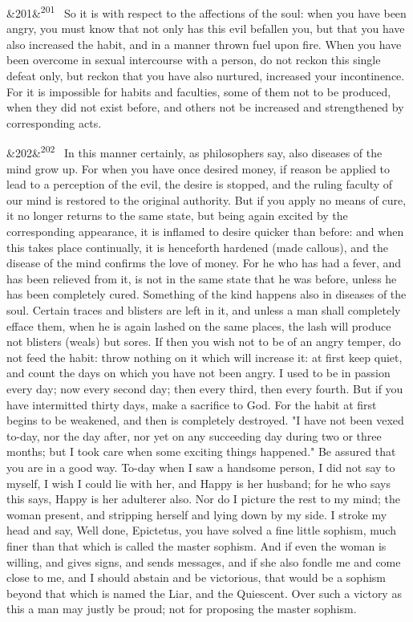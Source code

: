 \documentclass[12pt]{article}
\newcommand{\para}[1][]{\par\noindent\ifx&#1&\else\textsuperscript{\footnotesize #1}~\fi}
\begin{document}
\para[201] So it is with respect to the affections of the soul: when you have been angry, you must know that not only has this evil befallen you, but that you have also increased the habit, and in a manner thrown fuel upon fire. When you have been overcome in sexual intercourse with a person, do not reckon this single defeat only, but reckon that you have also nurtured, increased your incontinence. For it is impossible for habits and faculties, some of them not to be produced, when they did not exist before, and others not be increased and strengthened by corresponding acts.

\para[202] In this manner certainly, as philosophers say, also diseases of the mind grow up. For when you have once desired money, if reason be applied to lead to a perception of the evil, the desire is stopped, and the ruling faculty of our mind is restored to the original authority. But if you apply no means of cure, it no longer returns to the same state, but being again excited by the corresponding appearance, it is inflamed to desire quicker than before: and when this takes place continually, it is henceforth hardened (made callous), and the disease of the mind confirms the love of money. For he who has had a fever, and has been relieved from it, is not in the same state that he was before, unless he has been completely cured. Something of the kind happens also in diseases of the soul. Certain traces and blisters are left in it, and unless a man shall completely efface them, when he is again lashed on the same places, the lash will produce not blisters (weals) but sores. If then you wish not to be of an angry temper, do not feed the habit: throw nothing on it which will increase it: at first keep quiet, and count the days on which you have not been angry. I used to be in passion every day; now every second day; then every third, then every fourth. But if you have intermitted thirty days, make a sacrifice to God. For the habit at first begins to be weakened, and then is completely destroyed. "I have not been vexed to-day, nor the day after, nor yet on any succeeding day during two or three months; but I took care when some exciting things happened." Be assured that you are in a good way. To-day when I saw a handsome person, I did not say to myself, I wish I could lie with her, and Happy is her husband; for he who says this says, Happy is her adulterer also. Nor do I picture the rest to my mind; the woman present, and stripping herself and lying down by my side. I stroke my head and say, Well done, Epictetus, you have solved a fine little sophism, much finer than that which is called the master sophism. And if even the woman is willing, and gives signs, and sends messages, and if she also fondle me and come close to me, and I should abstain and be victorious, that would be a sophism beyond that which is named the Liar, and the Quiescent. Over such a victory as this a man may justly be proud; not for proposing the master sophism.
\end{document}
